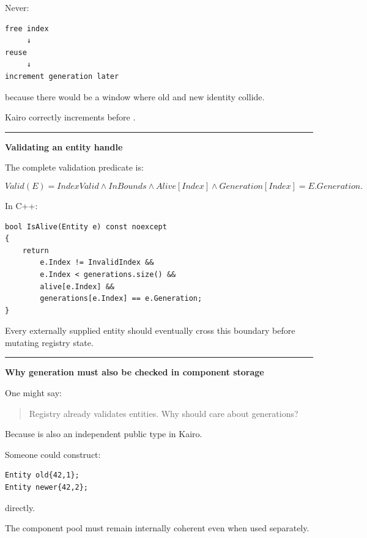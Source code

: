 Never:

\begin{verbatim}
free index
     ↓
reuse
     ↓
increment generation later
\end{verbatim}

because there would be a window where old and new identity collide.

Kairo correctly increments before .

\begin{center}\rule{0.5\linewidth}{0.5pt}\end{center}

\textbf{Validating an entity handle}

The complete validation predicate is:

\[
Valid(E)=
IndexValid
\land
InBounds
\land
Alive[Index]
\land
Generation[Index]=E.Generation.
\]

In C++:

\begin{verbatim}
bool IsAlive(Entity e) const noexcept
{
    return
        e.Index != InvalidIndex &&
        e.Index < generations.size() &&
        alive[e.Index] &&
        generations[e.Index] == e.Generation;
}
\end{verbatim}

Every externally supplied entity should eventually cross this boundary before mutating registry state.

\begin{center}\rule{0.5\linewidth}{0.5pt}\end{center}

\textbf{Why generation must also be checked in component storage}

One might say:

\begin{quote}
Registry already validates entities. Why should  care about generations?
\end{quote}

Because  is also an independent public type in Kairo.

Someone could construct:

\begin{verbatim}
Entity old{42,1};
Entity newer{42,2};
\end{verbatim}

directly.

The component pool must remain internally coherent even when used separately.

